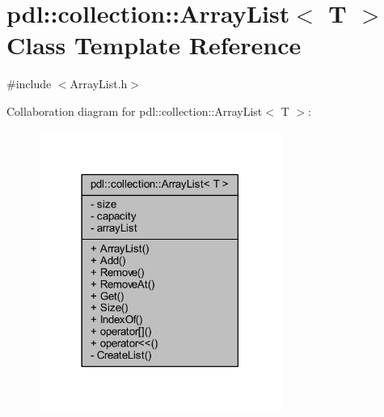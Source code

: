 \hypertarget{classpdl_1_1collection_1_1_array_list}{}\section{pdl\+::collection\+::Array\+List$<$ T $>$ Class Template Reference}
\label{classpdl_1_1collection_1_1_array_list}


{\ttfamily \#include $<$Array\+List.\+h$>$}



Collaboration diagram for pdl\+::collection\+::Array\+List$<$ T $>$\+:
\nopagebreak
\begin{figure}[H]
\begin{center}
\leavevmode
\includegraphics[width=225pt]{classpdl_1_1collection_1_1_array_list__coll__graph}
\end{center}
\end{figure}
